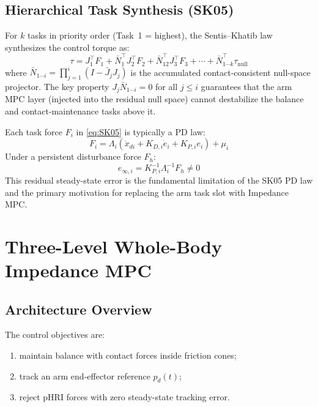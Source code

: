 \subsection{Hierarchical Task Synthesis (SK05)}

For $k$ tasks in priority order (Task~1 = highest), the Sentis--Khatib
law~\cite{sentis2005synthesis} synthesizes the control torque as:
\begin{equation}\label{eq:SK05}
  \tau = J_1^\top F_1 + \bar{N}_1^\top J_2^\top F_2
       + \bar{N}_{12}^\top J_3^\top F_3 + \cdots
       + \bar{N}_{1\cdots k}^\top\tau_{\text{null}}
\end{equation}
where $\bar{N}_{1\cdots i}=\prod_{j=1}^{i}(I-\bar{J}_jJ_j)$ is the
accumulated contact-consistent null-space projector.
The key property $J_j\bar{N}_{1\cdots i}=0$ for all $j\leq i$ guarantees
that the arm MPC layer (injected into the residual null space) cannot
destabilize the balance and contact-maintenance tasks above it.

Each task force $F_i$ in \eqref{eq:SK05} is typically a PD law:
\begin{equation}\label{eq:PD}
  F_i = \Lambda_i(\ddot{x}_{di}+K_{D,i}\dot{e}_i+K_{P,i}e_i)+\mu_i
\end{equation}
Under a persistent disturbance force $F_h$:
\begin{equation}\label{eq:sse}
  e_{\infty,i} = K_{P,i}^{-1}\Lambda_i^{-1}F_h \neq 0
\end{equation}
This residual steady-state error is the fundamental limitation of the SK05
PD law and the primary motivation for replacing the arm task slot with
Impedance MPC.

\section{Three-Level Whole-Body Impedance MPC}\label{sec:impedancempc}

\subsection{Architecture Overview}

The control objectives are:
\begin{enumerate}
  \item maintain balance with contact forces inside friction cones;
  \item track an arm end-effector reference $p_d(t)$;
  \item reject pHRI forces with zero steady-state tracking error.
\end{enumerate}

